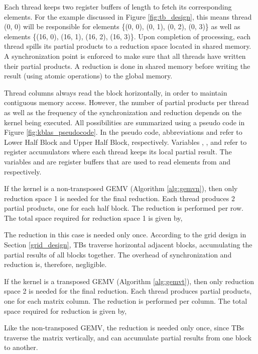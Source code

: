 Each thread keeps two register buffers of length  to fetch its corresponding elements. For the example discussed 
in Figure \ref{fig:tb_design}, this means 
thread (0, 0) will be responsible for elements \{(0, 0), (0, 1), (0, 2), (0, 3)\} as well as elements \{(16, 0), (16, 1), (16, 2), (16, 3)\}.
Upon completion of processing, each thread spills its partial products to a reduction space located in shared memory. A synchronization point 
is enforced to make sure that all threads have written their partial products. 
A reduction is done 
in shared memory before writing the result (using atomic operations) to the global memory. 

Thread columns always read the block horizontally, in order to maintain contiguous memory access. 
However, the number of partial products per thread as well as the frequency of the 
synchronization and reduction depends on the kernel being executed. All possibilities are summarized using a pseudo code in Figure 
\ref{fig:kblas_pseudocode}. In the pseudo code, abbreviations  and  refer to Lower Half Block and Upper Half Block, respectively.
Variables , , and  refer to register accumulators where each thread keeps its local partial result. 
The variables  and  are register buffers that are used to read elements from  and  respectively. 

If the kernel is a non-transposed GEMV (Algorithm \ref{alg:gemvn}), then only reduction space 1 is needed for the final reduction. Each thread produces 2 partial 
products, one for each half block. The reduction is performed per row. The total space required for reduction space 1 is given by,

The reduction in this case is needed only once. According to the grid design in Section \ref{grid_design}, TBs traverse horizontal adjacent 
blocks, accumulating the partial results of all blocks together. The overhead of synchronization and reduction is, therefore, negligible. 

If the kernel is a transposed GEMV (Algorithm \ref{alg:gemvt}), then only reduction space 2 is needed for the final reduction. Each thread produces  partial 
products, one for each matrix column. The reduction is performed per column. The total space required for reduction is given by, 

Like the non-transposed GEMV, the reduction is needed only once, since TBs traverse the matrix vertically, and can accumulate partial results 
from one block to another. 

